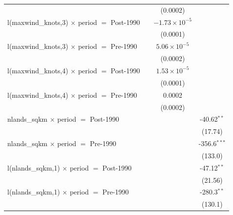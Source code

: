 \begin{tabular}{lccc}
                                                              &                & (0.0002)                &   \\   
   l(maxwind\_knots,3) $\times$ period $=$ Post-1990          &                & $-1.73\times 10^{-5}$   &   \\   
                                                              &                & (0.0001)                &   \\   
   l(maxwind\_knots,3) $\times$ period $=$ Pre-1990           &                & $5.06\times 10^{-5}$    &   \\   
                                                              &                & (0.0002)                &   \\   
   l(maxwind\_knots,4) $\times$ period $=$ Post-1990          &                & $1.53\times 10^{-5}$    &   \\   
                                                              &                & (0.0001)                &   \\   
   l(maxwind\_knots,4) $\times$ period $=$ Pre-1990           &                & 0.0002                  &   \\   
                                                              &                & (0.0002)                &   \\   
   nlands\_sqkm $\times$ period $=$ Post-1990                 &                &                         & -40.62$^{**}$\\   
                                                              &                &                         & (17.74)\\   
   nlands\_sqkm $\times$ period $=$ Pre-1990                  &                &                         & -356.6$^{***}$\\   
                                                              &                &                         & (133.0)\\   
   l(nlands\_sqkm,1) $\times$ period $=$ Post-1990            &                &                         & -47.12$^{**}$\\   
                                                              &                &                         & (21.56)\\   
   l(nlands\_sqkm,1) $\times$ period $=$ Pre-1990             &                &                         & -280.3$^{**}$\\   
                                                              &                &                         & (130.1)\\   

\end{tabular}
